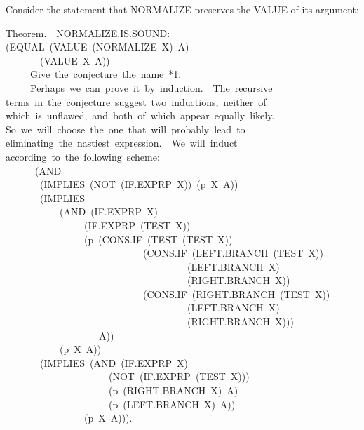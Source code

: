 \documentclass[11pt]{book}
\newenvironment{pubasis}{\begin{flushleft}\ttfamily\small}{\normalsize\rmfamily\end{flushleft}}
\begin{document}
Consider the statement that NORMALIZE preserves the
VALUE of its argument:
\begin{pubasis}
Theorem.~~NOR\-MAL\-IZE.IS.SOUND:\\
(EQUAL~(VALUE~(NORMALIZE~X)~A)\\
~~~~~~~(VALUE~X~A))\\

~~~~~Give~the~conjecture~the~name~*1.\\

~~~~~Perhaps~we~can~prove~it~by~induction.~~The~recursive\\
terms~in~the~conjecture~suggest~two~inductions,~neither~of\\
which~is~unflawed,~and~both~of~which~appear~equally~likely.\\
So~we~will~choose~the~one~that~will~probably~lead~to\\
eliminating~the~nastiest~expression.~~We~will~induct\\
according~to~the~following~scheme:\\
~~~~~~(AND\\
~~~~~~~(IMPLIES~(NOT~(IF.EXPRP~X))~(p~X~A))\\
~~~~~~~(IMPLIES\\
~~~~~~~~~~~(AND~(IF.EXPRP~X)\\
~~~~~~~~~~~~~~~~(IF.EXPRP~(TEST~X))\\
~~~~~~~~~~~~~~~~(p~(CONS.IF~(TEST~(TEST~X))\\
~~~~~~~~~~~~~~~~~~~~~~~~~~~~(CONS.IF~(LEFT.BRANCH~(TEST~X))\\
~~~~~~~~~~~~~~~~~~~~~~~~~~~~~~~~~~~~~(LEFT.BRANCH~X)\\
~~~~~~~~~~~~~~~~~~~~~~~~~~~~~~~~~~~~~(RIGHT.BRANCH~X))\\
~~~~~~~~~~~~~~~~~~~~~~~~~~~~(CONS.IF~(RIGHT.BRANCH~(TEST~X))\\
~~~~~~~~~~~~~~~~~~~~~~~~~~~~~~~~~~~~~(LEFT.BRANCH~X)\\
~~~~~~~~~~~~~~~~~~~~~~~~~~~~~~~~~~~~~(RIGHT.BRANCH~X)))\\
~~~~~~~~~~~~~~~~~~~A))\\
~~~~~~~~~~~(p~X~A))\\
~~~~~~~(IMPLIES~(AND~(IF.EXPRP~X)\\
~~~~~~~~~~~~~~~~~~~~~(NOT~(IF.EXPRP~(TEST~X)))\\
~~~~~~~~~~~~~~~~~~~~~(p~(RIGHT.BRANCH~X)~A)\\
~~~~~~~~~~~~~~~~~~~~~(p~(LEFT.BRANCH~X)~A))\\
~~~~~~~~~~~~~~~~(p~X~A))).\\

\end{pubasis}
\end{document}

